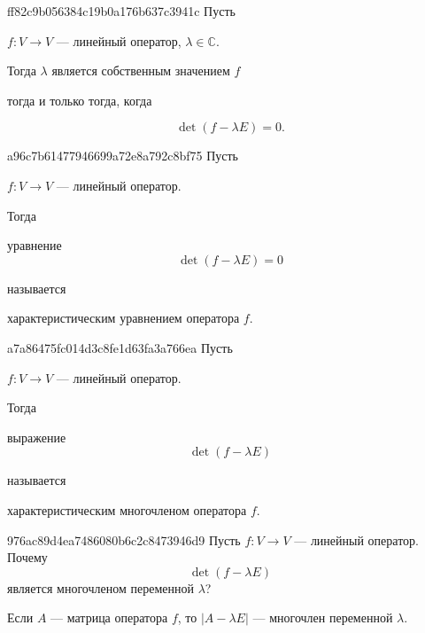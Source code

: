 \begin{note}{ff82c9b056384c19b0a176b637c3941c}
    Пусть \begin{icloze}{3}\( f : V \to V \) --- линейный оператор,  \( \lambda \in \mathbb C  \).\end{icloze} Тогда \( \lambda \) является собственным значением \( f \) \begin{icloze}{2}тогда и только тогда, когда\end{icloze}
    \begin{icloze}{1}
        \[
            \det (f - \lambda E) = 0.
        \]
    \end{icloze}
\end{note}

\begin{note}{a96c7b61477946699a72e8a792c8bf75}
    Пусть \begin{icloze}{3}\( f : V \to V \) --- линейный оператор.\end{icloze} Тогда \begin{icloze}{2}уравнение
    \[
        \det (f - \lambda E) = 0
    \]
    \end{icloze} называется \begin{icloze}{1}характеристическим уравнением оператора \( f \).\end{icloze}
\end{note}

\begin{note}{a7a86475fc014d3c8fe1d63fa3a766ea}
    Пусть \begin{icloze}{3}\( f : V \to V \) --- линейный оператор.\end{icloze} Тогда \begin{icloze}{2}выражение
    \[
        \det (f - \lambda E)
    \]
    \end{icloze} называется \begin{icloze}{1}характеристическим многочленом оператора \( f \).\end{icloze}
\end{note}

\begin{note}{976ac89d4ea7486080b6c2c8473946d9}
    Пусть \( f : V \to V \) --- линейный оператор. Почему
    \[
        \det (f - \lambda E)
    \]
    является многочленом переменной \( \lambda \)?

    \begin{cloze}{1}
        Если \( A \) --- матрица оператора \( f \), то \( \left| A - \lambda E \right|  \) --- многочлен переменной \( \lambda \).
    \end{cloze}
\end{note}

